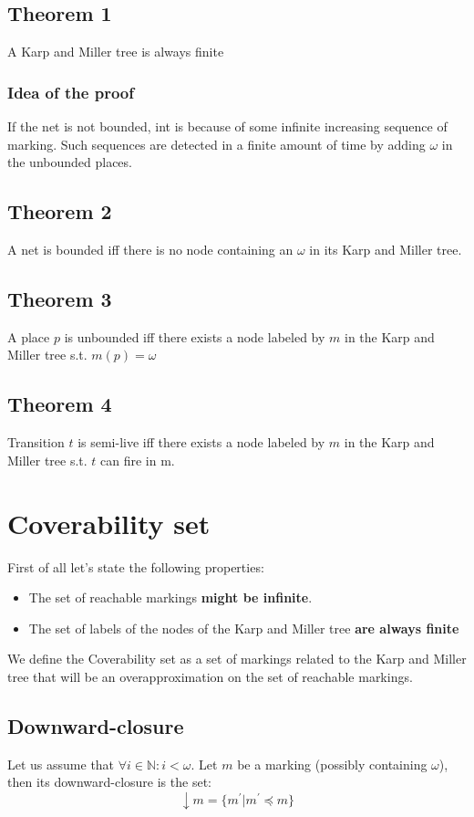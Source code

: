 \subsection{Theorem 1}
A Karp and Miller tree is always finite
\subsubsection{Idea of the proof}
If the net is not bounded, int is because of some infinite increasing sequence of marking. Such sequences are detected in a finite amount of time by adding $\omega$ in the unbounded places.

\subsection{Theorem 2}
A net is bounded iff there is no node containing an $\omega$ in its Karp and Miller tree.

\subsection{Theorem 3}
A place $p$ is unbounded iff there exists a node labeled by $m$ in the Karp and Miller tree s.t. $m(p) = \omega$

\subsection{Theorem 4}
Transition $t$ is semi-live iff there exists a node labeled by $m$ in the Karp and Miller tree s.t. $t$ can fire in m.

\section{Coverability set}
First of all let's state the following properties:
\begin{itemize}
    \item The set of reachable markings \textbf{might be infinite}.
    \item The set of labels of the nodes of the Karp and Miller tree \textbf{are always finite}
\end{itemize}

We define the Coverability set as a set of markings related to the Karp and Miller tree that will be an overapproximation on the set of reachable markings.

\subsection{Downward-closure}
Let us assume that $\forall i \in \mathbb{N} : i < \omega$.
Let $m$ be a marking (possibly containing $\omega$), then its downward-closure is the set:
\begin{equation*}
    \downarrow m = \{m^{'} | m^{'} \preceq m\}
\end{equation*}

